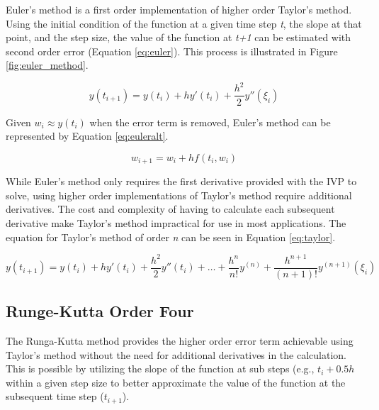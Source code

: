 \documentclass{article}
\begin{document}
Euler's method is a first order implementation of higher order Taylor's method. Using the initial condition of the function at a given time step \textit{t}, the slope at that point, and the step size, the value of the function at \textit{t+1} can be estimated with second order error (Equation \ref{eq:euler}). This process is illustrated in Figure \ref{fig:euler_method}.

\begin{center}
	\begin{equation}
	y(t_{i+1}) = y(t_i) + hy'(t_i)+\frac{h^2}{2}y''(\xi_i) 
	\label{eq:euler}
	\end{equation}
\end{center}

Given $w_i \approx y(t_i)$ when the error term is removed, Euler's method can be represented by Equation \ref{eq:euleralt}.

\begin{center}
	\begin{equation}
	w_{i+1} = w_i + hf(t_i, w_i)
	\label{eq:euleralt}
	\end{equation}
\end{center}


While Euler's method only requires the first derivative provided with the IVP to solve, using higher order implementations of Taylor's method require additional derivatives. The cost and complexity of having to calculate each subsequent derivative make Taylor's method impractical for use in most applications. The equation for Taylor's method of order \textit{n} can be seen in Equation \ref{eq:taylor}.

\begin{center}
	\begin{equation}
	y(t_{i+1}) = y(t_i) + hy'(t_i)+\frac{h^2}{2}y''(t_i) + \dots + \frac{h^n}{n!}y^{(n)} + \frac{h^{n+1}}{(n+1)!}y^{(n+1)}(\xi_i) 
	\label{eq:taylor}
	\end{equation}
\end{center}


\subsection{Runge-Kutta Order Four}
\label{method:rk}


The Runga-Kutta method provides the higher order error term achievable using Taylor's method without the need for additional derivatives in the calculation. This is possible by utilizing the slope of the function at sub steps (e.g., $t_i+0.5h$ within a given step size to better approximate the value of the function at the subsequent time step ($t_{i+1}$).
\end{document}
